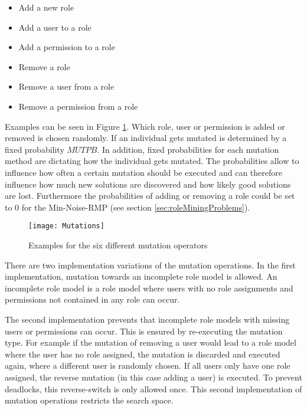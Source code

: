         \begin{itemize}
            \setlength{\itemsep}{1pt}
            \item Add a new role
            \item Add a user to a role
            \item Add a permission to a role
            \item Remove a role
            \item Remove a user from a role
            \item Remove a permission from a role
        \end{itemize}
        
        Examples can be seen in Figure \ref{fig:mutationOperations}. Which role, user or permission is added or removed is chosen randomly. If an individual gets mutated is determined by a fixed probability $MUTPB$. In addition, fixed probabilities for each mutation method are dictating how the individual gets mutated. The probabilities allow to influence how often a certain mutation should be executed and can therefore influence how much new solutions are discovered and how likely good solutions are lost. Furthermore the probabilities of adding or removing a role could be set to 0 for the Min-Noise-RMP (see section \ref{sec:roleMiningProblems}).
        
        \begin{figure}[H]
              	\centering
              	\texttt{[image: Mutations]}
              	\caption{Examples for the six different mutation operators}
              	\label{fig:mutationOperations}
        \end{figure}
                
        There are two implementation variations of the mutation operations. In the first implementation, mutation towards an incomplete role model is allowed. An incomplete role model is a role model where users with no role assignments and permissions not contained in any role can occur.
       
        The second implementation prevents that incomplete role models with missing users or permissions can occur. This is ensured by re-executing the mutation type. For example if the mutation of removing a user would lead to a role model where the user has no role assigned, the mutation is discarded and executed again, where a different user is randomly chosen. If all users only have one role assigned, the reverse mutation (in this case adding a user) is executed. To prevent deadlocks, this reverse-switch is only allowed once. This second implementation of mutation operations restricts the search space. 
        
